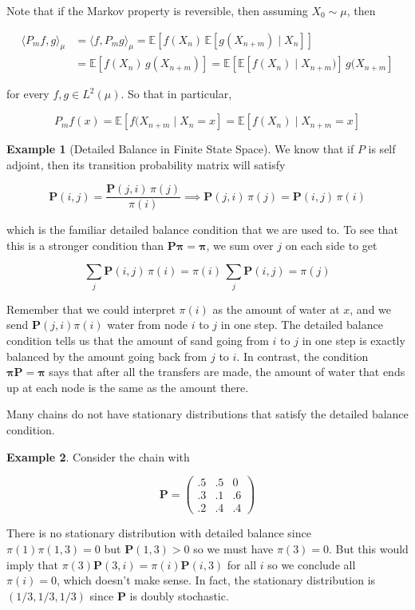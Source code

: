 \documentclass{article}
\theoremstyle{definition}
\newtheorem{example}{Example}[section]
\theoremstyle{remark}
\theoremstyle{definition}
\begin{document}
    Note that if the Markov property is reversible, then assuming $X_0 \sim \mu$, then 

    \begin{align*}
      \langle P_m f, g \rangle_\mu & = \langle f, P_m g \rangle_\mu = \mathbb{E}[ f(X_n) \, \mathbb{E}[g(X_{n + m}) \mid X_n]] \\
      & = \mathbb{E}[ f(X_n) \, g(X_{n + m})] = \mathbb{E}[ \mathbb{E}[ f(X_n) \mid X_{n + m})] \, g(X_{n + m}] 
    \end{align*}

    for every $f, g \in L^2 (\mu)$. So that in particular, 

      \[P_m f (x) = \mathbb{E}[f(X_{n + m} \mid X_n = x] = \mathbb{E}[f(X_n) \mid X_{n + m} = x]\]

    \begin{example}[Detailed Balance in Finite State Space]
      We know that if $P$ is self adjoint, then its transition probability matrix will satisfy 

        \[\mathbf{P}(i, j) = \frac{\mathbf{P}(j, i) \, \pi(j)}{\pi(i)} \implies \mathbf{P}(j, i) \, \pi(j) = \mathbf{P}(i, j) \, \pi(i)\]

      which is the familiar detailed balance condition that we are used to. To see that this is a stronger condition than $\mathbf{P} \boldsymbol{\pi} = \boldsymbol{\pi}$, we sum over $j$ on each side to get 

        \[\sum_j \mathbf{P}(i, j) \, \pi(i) = \pi(i) \, \sum_j \mathbf{P}(i, j) = \pi(j)\]

      Remember that we could interpret $\pi(i)$ as the amount of water at $x$, and we send $\mathbf{P}(j, i) \pi(i)$ water from node $i$ to $j$ in one step. The detailed balance condition tells us that the amount of sand going from $i$ to $j$ in one step is exactly balanced by the amount going back from $j$ to $i$. In contrast, the condition $\boldsymbol{\pi} \mathbf{P} = \boldsymbol{\pi}$ says that after all the transfers are made, the amount of water that ends up at each node is the same as the amount there. 
    \end{example}

    Many chains do not have stationary distributions that satisfy the detailed balance condition. 

    \begin{example}
      Consider the chain with 

        \[\mathbf{P} = \begin{pmatrix} .5 & .5 & 0 \\ .3 & .1 & .6 \\ .2 & .4 & .4 \end{pmatrix}\]

      There is no stationary distribution with detailed balance since $\pi(1) \pi(1, 3) = 0$ but $\mathbf{P}(1, 3) > 0$ so we must have $\pi(3) = 0$. But this would imply that $\pi(3) \mathbf{P}(3, i) = \pi(i) \mathbf{P}(i, 3)$ for all $i$ so we conclude all $\pi(i) = 0$, which doesn't make sense. In fact, the stationary distribution is $(1/3, 1/3, 1/3)$ since $\mathbf{P}$ is doubly stochastic. 
    \end{example}
\end{document}
